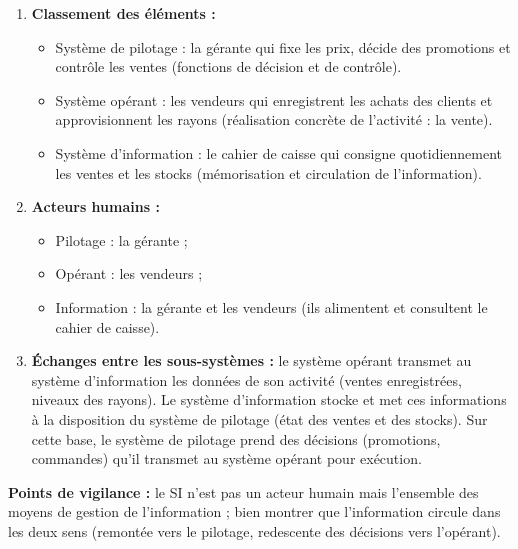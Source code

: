 \documentclass[11pt]{article}
\newcommand{\cle}[1]{{\popxbold\color{popdark}#1}}
\begin{document}
\begin{corrige}
\begin{enumerate}
  \item \textbf{Classement des éléments :}
  \begin{itemize}
    \item \cle{Système de pilotage} : la gérante qui fixe les prix, décide des promotions et contrôle les ventes (fonctions de décision et de contrôle).
    \item \cle{Système opérant} : les vendeurs qui enregistrent les achats des clients et approvisionnent les rayons (réalisation concrète de l'activité : la vente).
    \item \cle{Système d'information} : le cahier de caisse qui consigne quotidiennement les ventes et les stocks (mémorisation et circulation de l'information).
  \end{itemize}
  \item \textbf{Acteurs humains :}
  \begin{itemize}
    \item Pilotage : la gérante ;
    \item Opérant : les vendeurs ;
    \item Information : la gérante et les vendeurs (ils alimentent et consultent le cahier de caisse).
  \end{itemize}
  \item \textbf{Échanges entre les sous-systèmes :} le système opérant transmet au système d'information les données de son activité (ventes enregistrées, niveaux des rayons). Le système d'information stocke et met ces informations à la disposition du système de pilotage (état des ventes et des stocks). Sur cette base, le système de pilotage prend des décisions (promotions, commandes) qu'il transmet au système opérant pour exécution.
\end{enumerate}
\textbf{Points de vigilance :} le SI n'est pas un acteur humain mais l'ensemble des moyens de gestion de l'information ; bien montrer que l'information circule dans les deux sens (remontée vers le pilotage, redescente des décisions vers l'opérant).
\end{corrige}
\end{document}
